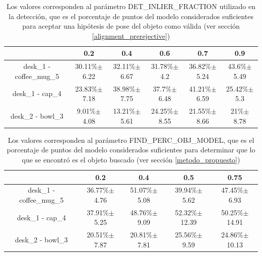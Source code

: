 \begin{table}[h]
	\begin{tabular}{|c|c|c|c|c|c|}
	\hline 
	 & 0.2 & 0.4 & 0.6 & 0.7 & 0.9 \\ 
	\hline 
	desk\_1 - coffee\_mug\_5 & 30.11\%$\pm$6.22 & 32.11\%$\pm$6.67 & 31.78\%$\pm$4.2 & 36.82\%$\pm$5.24 & 43.6\%$\pm$5.49\\ 
	\hline 
	desk\_1 - cap\_4 & 23.83\%$\pm$7.18 & 38.98\%$\pm$7.75 & 37.7\%$\pm$6.48 & 41.21\%$\pm$6.59 & 25.42\%$\pm$5.3\\ 
	\hline 
	desk\_2 - bowl\_3 & 9.01\%$\pm$4.08 & 13.21\%$\pm$5.61 & 24.25\%$\pm$8.55 & 21.55\%$\pm$8.66 & 21\%$\pm$8.78\\ 
	\hline 
	\end{tabular}
	\caption{Los valores corresponden al parámetro DET\_INLIER\_FRACTION utilizado en la detección, que es el porcentaje de puntos del modelo considerados suficientes para aceptar una hipótesis de pose del objeto como válida (ver sección \ref{alignment_prerejective})}
\end{table}


\begin{table}[h]
	\begin{tabular}{|c|c|c|c|c|}
	\hline 
	 & 0.2 & 0.4 & 0.5 & 0.75 \\ 
	\hline 
	desk\_1 - coffee\_mug\_5 & 36.77\%$\pm$4.76 & 51.07\%$\pm$5.08 & 39.94\%$\pm$5.62 & 47.45\%$\pm$6.93 \\ 
	\hline 
	desk\_1 - cap\_4 & 37.91\%$\pm$5.25 & 48.76\%$\pm$9.09 & 52.32\%$\pm$12.39 & 50.25\%$\pm$14.91 \\ 
	\hline 
	desk\_2 - bowl\_3 & 20.51\%$\pm$7.87 & 20.81\%$\pm$7.81 & 25.56\%$\pm$9.59 & 24.86\%$\pm$10.13 \\ 
	\hline 
	\end{tabular}
	\caption{Los valores corresponden al parámetro FIND\_PERC\_OBJ\_MODEL, que es el porcentaje de puntos del modelo considerados suficientes para determinar que lo que se encontró es el objeto buscado (ver sección \ref{metodo_propuesto})}
\end{table}

